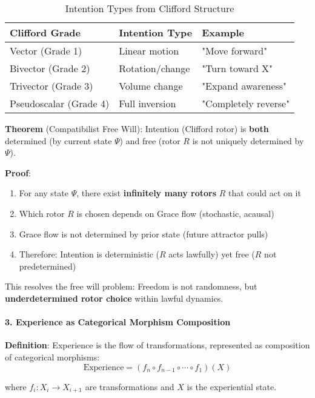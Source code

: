 \documentclass[12pt,a4paper]{article}
\begin{document}
\begin{table}[H]
\centering
\caption{Intention Types from Clifford Structure}
\begin{tabular}{@{}lll@{}}
\toprule
Clifford Grade & Intention Type & Example \\ \midrule
Vector (Grade 1) & Linear motion & "Move forward" \\
Bivector (Grade 2) & Rotation/change & "Turn toward X" \\
Trivector (Grade 3) & Volume change & "Expand awareness" \\
Pseudoscalar (Grade 4) & Full inversion & "Completely reverse" \\
\bottomrule
\end{tabular}
\end{table}

\textbf{Theorem} (Compatibilist Free Will): Intention (Clifford rotor) is \textbf{both} determined (by current state $\Psi$) and free (rotor $R$ is not uniquely determined by $\Psi$).

\textbf{Proof}:
\begin{enumerate}
\item For any state $\Psi$, there exist \textbf{infinitely many rotors} $R$ that could act on it
\item Which rotor $R$ is chosen depends on Grace flow (stochastic, acausal)
\item Grace flow is not determined by prior state (future attractor pulls)
\item Therefore: Intention is deterministic ($R$ acts lawfully) yet free ($R$ not predetermined)
\end{enumerate}

This resolves the free will problem: Freedom is not randomness, but \textbf{underdetermined rotor choice} within lawful dynamics.

\paragraph{3. Experience as Categorical Morphism Composition}

\textbf{Definition}: Experience is the flow of transformations, represented as composition of categorical morphisms:
\begin{equation}
\text{Experience} = (f_n \circ f_{n-1} \circ \cdots \circ f_1)(X)
\end{equation}

where $f_i: X_i \to X_{i+1}$ are transformations and $X$ is the experiential state.
\end{document}
